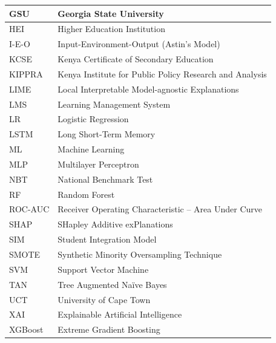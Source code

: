 \documentclass[12pt]{report}
\begin{document}
\begin{center}
\begin{longtable}{|p{3.2cm}|p{10.5cm}|}
\rowcolor{tablerowwhite} GSU     & Georgia State University \\ \hline
\rowcolor{tablerowlight} HEI     & Higher Education Institution \\ \hline
\rowcolor{tablerowwhite} I-E-O   & Input-Environment-Output (Astin's Model) \\ \hline
\rowcolor{tablerowlight} KCSE    & Kenya Certificate of Secondary Education \\ \hline
\rowcolor{tablerowwhite} KIPPRA  & Kenya Institute for Public Policy Research and Analysis \\ \hline
\rowcolor{tablerowlight} LIME    & Local Interpretable Model-agnostic Explanations \\ \hline
\rowcolor{tablerowwhite} LMS     & Learning Management System \\ \hline
\rowcolor{tablerowlight} LR      & Logistic Regression \\ \hline
\rowcolor{tablerowwhite} LSTM    & Long Short-Term Memory \\ \hline
\rowcolor{tablerowlight} ML      & Machine Learning \\ \hline
\rowcolor{tablerowwhite} MLP     & Multilayer Perceptron \\ \hline
\rowcolor{tablerowlight} NBT     & National Benchmark Test \\ \hline
\rowcolor{tablerowwhite} RF      & Random Forest \\ \hline
\rowcolor{tablerowlight} ROC-AUC & Receiver Operating Characteristic -- Area Under Curve \\ \hline
\rowcolor{tablerowwhite} SHAP    & SHapley Additive exPlanations \\ \hline
\rowcolor{tablerowlight} SIM     & Student Integration Model \\ \hline
\rowcolor{tablerowwhite} SMOTE   & Synthetic Minority Oversampling Technique \\ \hline
\rowcolor{tablerowlight} SVM     & Support Vector Machine \\ \hline
\rowcolor{tablerowwhite} TAN     & Tree Augmented Na\"{i}ve Bayes \\ \hline
\rowcolor{tablerowlight} UCT     & University of Cape Town \\ \hline
\rowcolor{tablerowwhite} XAI     & Explainable Artificial Intelligence \\ \hline
\rowcolor{tablerowlight} XGBoost & Extreme Gradient Boosting \\ \hline
\end{longtable}
\end{center}
\newpage
\end{document}
